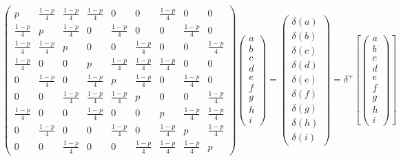 \documentclass{article}
\begin{document}
$$ \begin{pmatrix} p & \frac{1-p}{4} & \frac{1-p}{4} & \frac{1-p}{4} & 0 & 0 & \frac{1-p}{4} & 0 & 0 \\
							\frac{1-p}{4} & p & \frac{1-p}{4} & 0 & \frac{1-p}{4} & 0 & 0 & \frac{1-p}{4} & 0 \\
							\frac{1-p}{4} & \frac{1-p}{4} & p & 0 & 0 & \frac{1-p}{4} & 0 & 0 & \frac{1-p}{4} \\
							\frac{1-p}{4} & 0 & 0 & p & \frac{1-p}{4} & \frac{1-p}{4} & \frac{1-p}{4} & 0 & 0 \\
							0 & \frac{1-p}{4} & 0 & \frac{1-p}{4} & p & \frac{1-p}{4} & 0 & \frac{1-p}{4} & 0 \\
							0 & 0 & \frac{1-p}{4} & \frac{1-p}{4} & \frac{1-p}{4} & p & 0 & 0 & \frac{1-p}{4} \\
							\frac{1-p}{4} & 0 & 0 & \frac{1-p}{4} & 0 & 0 & p & \frac{1-p}{4} & \frac{1-p}{4} \\
							0 & \frac{1-p}{4} & 0 & 0 & \frac{1-p}{4} & 0 & \frac{1-p}{4} & p & \frac{1-p}{4} \\
							0 & 0 & \frac{1-p}{4} & 0 & 0 & \frac{1-p}{4} & \frac{1-p}{4} & \frac{1-p}{4} & p
	\end{pmatrix} \left( \begin{array}{c} a \\ b \\ c \\ d \\ e \\ f \\ g \\ h \\ i \end{array} \right) =  
	\left( \begin{array}{c} \delta(a) \\ \delta(b) \\ \delta(c) \\ \delta(d) \\ \delta(e) \\ \delta(f) \\ \delta(g) \\ \delta(h) \\ \delta(i) \end{array} \right)  = \delta^+  \left[ \left( \begin{array}{c} a \\ b \\ c \\ d \\ e \\ f \\ g \\ h \\ i \end{array} \right) \right] $$
\end{document}
